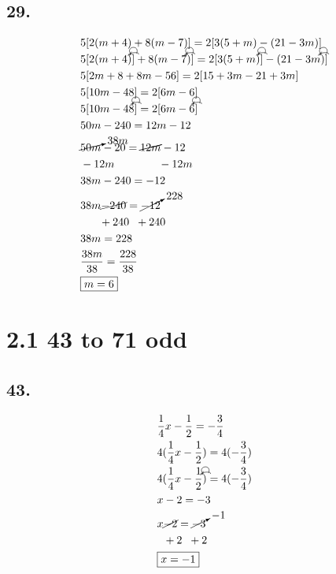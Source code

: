 \documentclass{article}
\newcommand{\tikzmark}[1]{\tikz[overlay,remember picture] \node (#1) {};}
\newcommand{\DrawBox}[2]{%
    \begin{tikzpicture}[overlay,remember picture]
        \draw[->,shorten >=5pt,shorten <=5pt,out=70,in=130,distance=0.5cm,#1] (MarkA.north) to (MarkC.north);
        \draw[->,shorten >=5pt,shorten <=5pt,out=50,in=140,distance=0.3cm,#2] (MarkA.north) to (MarkB.north);
    \end{tikzpicture}
}
\begin{document}
    \subsection*{29.}
    \begin{align*}
        & 5[2(m + 4) + 8(m - 7)] = 2[3(5 + m) - (21 - 3m)] \\
        & 5[2\tikzmark{MarkA} (m\tikzmark{MarkB} + 4\tikzmark{MarkC})]\DrawBox{black}{black} + \tikzmark{MarkA}8(m\tikzmark{MarkB} - 7\tikzmark{MarkC})\DrawBox{black}{black}] = 2[\tikzmark{MarkA}3 (5\tikzmark{MarkB} + m\tikzmark{MarkC})]\DrawBox{black}{black} - \tikzmark{MarkA} (21\tikzmark{MarkB} - 3m\tikzmark{MarkC})\DrawBox{black}{black}] \\
        & 5[2m + 8 + 8m - 56] = 2[15 + 3m -21 + 3m]\\
        & 5[10m - 48] = 2[6m -6] \\
        & \tikzmark{MarkA}5[10m\tikzmark{MarkB} - 48\tikzmark{MarkC}]\DrawBox{black}{black} = \tikzmark{MarkA}2[6m\tikzmark{MarkB} - 6\tikzmark{MarkC}]\DrawBox{black}{black}\\
        & 50m - 240 = 12m - 12\\
        & \cancelto{38m}{50m} - 20 = \cancel{12m} - 12\\
        & -12m \hspace{1.4cm} -12m \\
        & 38m - 240 = -12 \\
        & 38m \cancel{- 240} = \cancelto{228}{-12} \\
        & \hspace{.6cm} +240 \hspace{.2cm} + 240 \\
        & 38m = 228 \\
        & \frac{38m}{38} = \frac{228}{38} \\
        & \boxed{m = 6}
    \end{align*}

    \section*{2.1 43 to 71 odd}
    \subsection*{43.}
    \begin{align*}
        & \frac{1}{4}x - \frac{1}{2} = -\frac{3}{4} \\
        & 4(\frac{1}{4}x - \frac{1}{2}) = 4(-\frac{3}{4}) \\
        & 4\tikzmark{MarkA} (\frac{1}{4}x\tikzmark{MarkB} - \frac{1}{2}\tikzmark{MarkC})\DrawBox{black}{black} = 4(-\frac{3}{4}) \\
        & x - 2 = - 3 \\
        & x \cancel{- 2} = \cancelto{-1}{- 3} \\
        & \hspace{.2cm}+ 2 \hspace{.2cm} + 2 \\
        & \boxed{x = -1}
    \end{align*}
\end{document}
